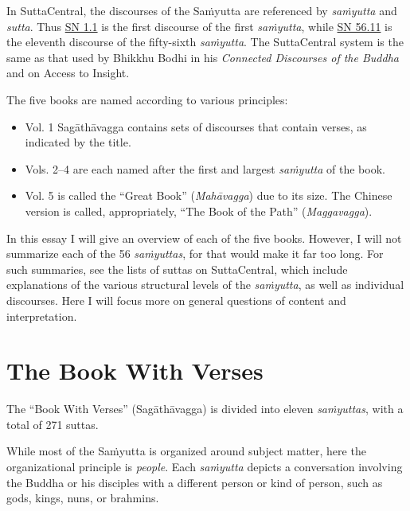 \documentclass[12pt,openany]{book}%
\begin{document}
In SuttaCentral, the discourses of the \textsanskrit{Saṁyutta} are referenced by \textit{\textsanskrit{saṁyutta}} and \textit{sutta}. Thus \href{https://suttacentral.net/sn1.1}{SN 1.1} is the first discourse of the first \textit{\textsanskrit{saṁyutta}}, while \href{https://suttacentral.net/sn56.11}{SN 56.11} is the eleventh discourse of the fifty-sixth \textit{\textsanskrit{saṁyutta}}. The SuttaCentral system is the same as that used by Bhikkhu Bodhi in his \textit{Connected Discourses of the Buddha} and on Access to Insight.

The five books are named according to various principles:

\begin{itemize}%
\item Vol. 1 \textsanskrit{Sagāthāvagga} contains sets of discourses that contain verses, as indicated by the title.%
\item Vols. 2–4 are each named after the first and largest \textit{\textsanskrit{saṁyutta}} of the book.%
\item Vol. 5 is called the “Great Book” (\textit{\textsanskrit{Mahāvagga}}) due to its size. The Chinese version is called, appropriately, “The Book of the Path” (\textit{Maggavagga}).%
\end{itemize}

In this essay I will give an overview of each of the five books. However, I will not summarize each of the 56 \textit{\textsanskrit{saṁyuttas}}, for that would make it far too long. For such summaries, see the lists of suttas on SuttaCentral, which include explanations of the various structural levels of the \textit{\textsanskrit{saṁyutta}}, as well as individual discourses. Here I will focus more on general questions of content and interpretation.

\section*{The Book With Verses}

The “Book With Verses” (\textsanskrit{Sagāthāvagga}) is divided into eleven \textit{\textsanskrit{saṁyuttas}}, with a total of 271 suttas.

While most of the \textsanskrit{Saṁyutta} is organized around subject matter, here the organizational principle is \emph{people}. Each \textit{\textsanskrit{saṁyutta}} depicts a conversation involving the Buddha or his disciples with a different person or kind of person, such as gods, kings, nuns, or brahmins.
\end{document}
